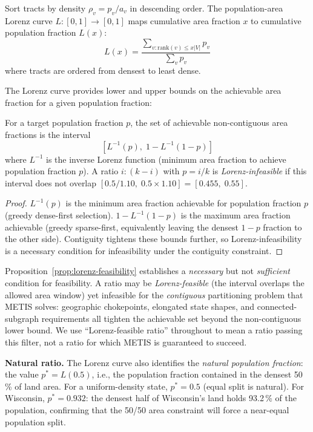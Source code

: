 \begin{definition}
Sort tracts by density $\rho_v = p_v / a_v$ in descending order.
The population-area Lorenz curve $L : [0,1] \to [0,1]$ maps cumulative area
fraction $x$ to cumulative population fraction $L(x)$:
\[
  L(x) = \frac{\sum_{v : \mathrm{rank}(v) \leq x|V|} p_v}{\sum_v p_v}
\]
where tracts are ordered from densest to least dense.
\end{definition}

The Lorenz curve provides lower and upper bounds on the achievable area fraction
for a given population fraction:

\begin{proposition}
\label{prop:lorenz-feasibility}
For a target population fraction $p$, the set of achievable non-contiguous
area fractions is the interval
\[
  [L^{-1}(p),\; 1 - L^{-1}(1-p)]
\]
where $L^{-1}$ is the inverse Lorenz function (minimum area fraction to
achieve population fraction $p$).
A ratio $i:(k-i)$ with $p = i/k$ is \emph{Lorenz-infeasible} if this interval
does not overlap $[0.5/1.10,\; 0.5 \times 1.10] = [0.455,\; 0.55]$.
\end{proposition}

\begin{proof}
$L^{-1}(p)$ is the minimum area fraction achievable for population fraction $p$
(greedy dense-first selection). $1 - L^{-1}(1-p)$ is the maximum area fraction
achievable (greedy sparse-first, equivalently leaving the densest $1-p$
fraction to the other side). Contiguity tightens these bounds further, so
Lorenz-infeasibility is a necessary condition for infeasibility under the
contiguity constraint.
\end{proof}

\begin{remark}
Proposition~\ref{prop:lorenz-feasibility} establishes a \emph{necessary} but
not \emph{sufficient} condition for feasibility.
A ratio may be \emph{Lorenz-feasible} (the interval overlaps the allowed area
window) yet infeasible for the \emph{contiguous} partitioning problem that METIS
solves: geographic chokepoints, elongated state shapes, and connected-subgraph
requirements all tighten the achievable set beyond the non-contiguous lower bound.
We use ``Lorenz-feasible ratio'' throughout to mean a ratio passing this filter,
not a ratio for which METIS is guaranteed to succeed.
\end{remark}

\noindent\textbf{Natural ratio.}
The Lorenz curve also identifies the \emph{natural population fraction}: the
value $p^* = L(0.5)$, i.e., the population fraction contained in the densest
50\,\% of land area.
For a uniform-density state, $p^* = 0.5$ (equal split is natural).
For Wisconsin, $p^* = 0.932$: the densest half of Wisconsin's land holds 93.2\,\%
of the population, confirming that the 50/50 area constraint will force a
near-equal population split.

